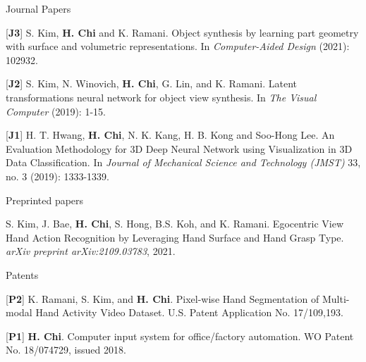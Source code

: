 \begin{cventries}

\cvpub
{Journal Papers} %
{ %
\begin{cvitems}
\item {[\textbf{J3}] S. Kim, \textbf{H. Chi} and K. Ramani. Object synthesis by learning part geometry with surface and volumetric representations. In \textit{Computer-Aided Design} (2021): 102932.}
\item {[\textbf{J2}] S. Kim, N. Winovich, \textbf{H. Chi}, G. Lin, and K. Ramani. Latent transformations neural network for object view synthesis. In \textit{The Visual Computer} (2019): 1-15.}
\item {[\textbf{J1}] H. T. Hwang, \textbf{H. Chi}, N. K. Kang, H. B. Kong and Soo-Hong Lee. An Evaluation Methodology for 3D Deep Neural Network using Visualization in 3D Data Classification. In \textit{Journal of Mechanical Science and Technology (JMST)} 33, no. 3 (2019): 1333-1339.}
\end{cvitems}
}

\cvpub
{Preprinted papers} %
{
\begin{cvitems}
\item {S. Kim, J. Bae, \textbf{H. Chi}, S. Hong, B.S. Koh, and K. Ramani. Egocentric View Hand Action Recognition by Leveraging Hand Surface and Hand Grasp Type. \textit{arXiv preprint arXiv:2109.03783}, 2021. }
\end{cvitems}
}

\cvpub
{Patents}{
\begin{cvitems}
\item {[\textbf{P2}] K. Ramani, S. Kim, and \textbf{H. Chi}. Pixel-wise Hand Segmentation of Multi-modal Hand Activity Video Dataset. U.S. Patent Application No. 17/109,193.}
\item {[\textbf{P1}] \textbf{H. Chi}. Computer input system for office/factory automation. WO Patent No. 18/074729, issued 2018.}
\end{cvitems}
}



\end{cventries}
